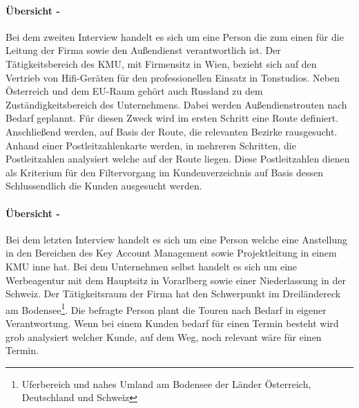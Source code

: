 \documentclass[Bachelorarbeit.tex]{subfiles}
\begin{document}
\paragraph*{Übersicht - }
Bei dem zweiten Interview handelt es sich um eine Person die zum einen für die Leitung der Firma sowie den Außendienst verantwortlich ist.
Der Tätigkeitsbereich des \ac{KMU}, mit Firmensitz in Wien, bezieht sich auf den Vertrieb von Hifi-Geräten für den professionellen Einsatz in Tonstudios.
Neben Österreich und dem EU-Raum gehört auch Russland zu dem Zuständigkeitsbereich des Unternehmens.
Dabei werden Außendienstrouten nach Bedarf geplannt.
Für diesen Zweck wird im ersten Schritt eine Route definiert. 
Anschließend werden, auf Basis der Route, die relevanten Bezirke rausgesucht.
Anhand einer Postleitzahlenkarte werden, in mehreren Schritten, die Postleitzahlen analysiert welche auf der Route liegen.
Diese Postleitzahlen dienen als Kriterium für den Filtervorgang im Kundenverzeichnis auf Basis dessen Schlussendlich die Kunden ausgesucht werden.

\paragraph*{Übersicht - }
Bei dem letzten Interview handelt es sich um eine Person welche eine Anstellung in den Bereichen des Key Account Management sowie Projektleitung in einem \ac{KMU} inne hat.
Bei dem Unternehmen selbst handelt es sich um eine Werbeagentur mit dem Hauptsitz in Vorarlberg sowie einer Niederlassung in der Schweiz.
Der Tätigkeitsraum der Firma hat den Schwerpunkt im Dreiländereck am Bodensee\footnote{Uferbereich und nahes Umland am Bodensee der Länder Österreich, Deutschland und Schweiz}. 
Die befragte Person plant die Touren nach Bedarf in eigener Verantwortung.
Wenn bei einem Kunden bedarf für einen Termin besteht wird grob analysiert welcher Kunde, auf dem Weg, noch relevant wäre für einen Termin.
\end{document}
